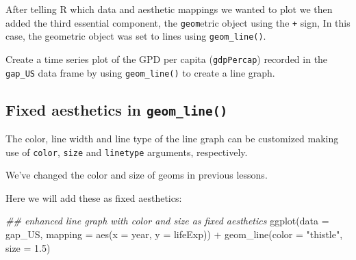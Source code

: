 \documentclass[
  letterpaper,
  DIV=11,
  numbers=noendperiod]{scrreprt}
\newenvironment{Shaded}{\begin{snugshade}}{\end{snugshade}}
\newcommand{\AttributeTok}[1]{\textcolor[rgb]{0.40,0.45,0.13}{#1}}
\newcommand{\DocumentationTok}[1]{\textcolor[rgb]{0.37,0.37,0.37}{\textit{#1}}}
\newcommand{\FloatTok}[1]{\textcolor[rgb]{0.68,0.00,0.00}{#1}}
\newcommand{\FunctionTok}[1]{\textcolor[rgb]{0.28,0.35,0.67}{#1}}
\newcommand{\NormalTok}[1]{\textcolor[rgb]{0.00,0.23,0.31}{#1}}
\newcommand{\SpecialCharTok}[1]{\textcolor[rgb]{0.37,0.37,0.37}{#1}}
\newcommand{\StringTok}[1]{\textcolor[rgb]{0.13,0.47,0.30}{#1}}
\begin{document}
After telling R which data and aesthetic mappings we wanted to plot we
then added the third essential component, the \texttt{geom}etric object
using the \texttt{+} sign, In this case, the geometric object was set to
lines using \texttt{geom\_line()}.

\begin{tcolorbox}[enhanced jigsaw, colframe=quarto-callout-tip-color-frame, rightrule=.15mm, opacityback=0, breakable, coltitle=black, colbacktitle=quarto-callout-tip-color!10!white, bottomrule=.15mm, leftrule=.75mm, toprule=.15mm, arc=.35mm, bottomtitle=1mm, colback=white, left=2mm, opacitybacktitle=0.6, titlerule=0mm, title=\textcolor{quarto-callout-tip-color}{\faLightbulb}\hspace{0.5em}{Practice}, toptitle=1mm]

Create a time series plot of the GPD per capita (\texttt{gdpPercap})
recorded in the \texttt{gap\_US} data frame by using
\texttt{geom\_line()} to create a line graph.

\end{tcolorbox}

\hypertarget{fixed-aesthetics-in-geom_line}{%
\subsection{\texorpdfstring{Fixed aesthetics in
\texttt{geom\_line()}}{Fixed aesthetics in geom\_line()}}\label{fixed-aesthetics-in-geom_line}}

The color, line width and line type of the line graph can be customized
making use of \texttt{color}, \texttt{size} and \texttt{linetype}
arguments, respectively.

We've changed the color and size of geoms in previous lessons.

Here we will add these as fixed aesthetics:

\begin{Shaded}
\begin{Highlighting}[]
\DocumentationTok{\#\# enhanced line graph with color and size as fixed aesthetics}
\FunctionTok{ggplot}\NormalTok{(}\AttributeTok{data =}\NormalTok{ gap\_US, }
       \AttributeTok{mapping =} \FunctionTok{aes}\NormalTok{(}\AttributeTok{x =}\NormalTok{ year, }
                     \AttributeTok{y =}\NormalTok{ lifeExp)) }\SpecialCharTok{+}
  \FunctionTok{geom\_line}\NormalTok{(}\AttributeTok{color =} \StringTok{"thistle"}\NormalTok{,}
            \AttributeTok{size =} \FloatTok{1.5}\NormalTok{) }
\end{Highlighting}
\end{Shaded}
\end{document}
